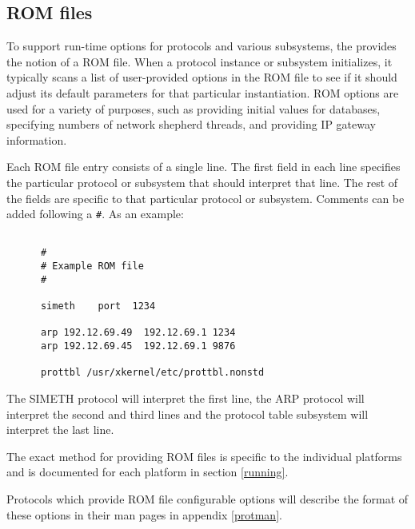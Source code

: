 % 
%
%
%
%
%


\subsection{ROM files}
\label{romfile}

To support run-time options for protocols and various subsystems, the
\xk{} provides the notion of a ROM file.  When a protocol instance or \xk{}
subsystem initializes, it typically scans a list of user-provided
options in the ROM file to see if it should adjust its default
parameters for that particular instantiation.  ROM options are used
for a variety of purposes, such as providing initial values for
databases, specifying numbers of network shepherd threads, and
providing IP gateway information.

Each ROM file entry consists of a single line.  The first field in
each line specifies the particular protocol or subsystem that
should interpret that line.  The rest of the fields are
specific to that particular protocol or subsystem.  Comments can be added
following a {\tt \#}.  As an example:

\begin{verbatim}

      #
      # Example ROM file
      #

      simeth 	port  1234

      arp 192.12.69.49  192.12.69.1 1234
      arp 192.12.69.45  192.12.69.1 9876

      prottbl /usr/xkernel/etc/prottbl.nonstd

\end{verbatim}


The SIMETH protocol will interpret the first line, the ARP protocol
will interpret the second and third lines and the protocol table
subsystem will interpret the last line.  

The exact method for providing ROM files is specific to the individual
platforms and is documented for each platform in section
\ref{running}. 

Protocols which provide ROM file configurable options will describe
the format of these options in their man pages in appendix
\ref{protman}. 



